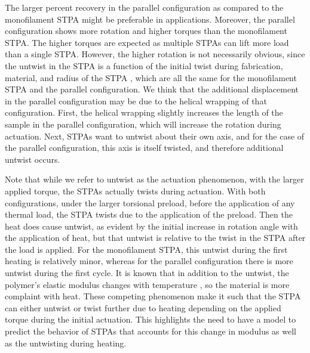 \documentclass[twocolumn,10pt]{asme2e}
\begin{document}
The larger percent recovery in the parallel configuration as compared to the monofilament STPA might be preferable in applications. Moreover, the parallel configuration shows more rotation and higher torques than the monofilament STPA.  The higher torques are expected as multiple STPAs can lift more load than a single STPA. However, the higher rotation is not necessarily obvious, since the untwist in the STPA is a function of the initial twist during fabrication, material, and radius of the STPA \cite{aziz_controlled}, which are all the same for the monofilament STPA and the parallel configuration. 
We think that the additional displacement in the parallel configuration may be due to the helical wrapping of that configuration.  First, the helical wrapping slightly increases the length of the sample in the parallel configuration, which will increase the rotation during actuation.  Next, STPAs want to untwist about their own axis, and for the case of the parallel configuration, this axis is itself twisted, and therefore additional untwist occurs.   

Note that while we refer to untwist as the actuation phenomenon, with the larger applied torque, the STPAs actually twists during actuation.  With both configurations, under the larger torsional preload, before the application of any thermal load, the STPA twists due to the application of the preload.  Then the heat does cause untwist, as evident by the initial increase in rotation angle with the application of heat, but that untwist is relative to the twist in the STPA after the load is applied.  
For the monofilament STPA, this untwist during the first heating is relatively minor, whereas for the parallel configuration there is more untwist during the first cycle.  It is known that in addition to the untwist, the polymer's elastic modulus changes with temperature \cite{shafer_first}, so the material is more complaint with heat. These competing phenomenon make it such that the STPA can either untwist or twist further due to heating depending on the applied torque during the initial actuation. This highlights the need to have a model to predict the behavior of STPAs that accounts for this change in modulus as well as the untwisting during heating.  
\end{document}
